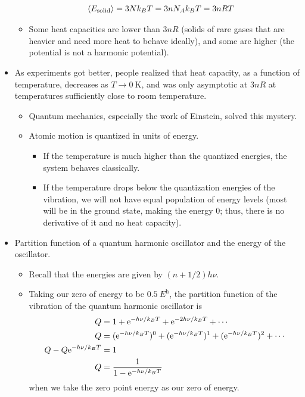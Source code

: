 \documentclass[../notes.tex]{subfiles}
\begin{document}
\begin{itemize}
\begin{itemize}
\begin{align*}
            \prb{E_\text{solid}} &= 3Nk_BT = 3nN_Ak_BT = 3nRT
        \end{align*}
        \item Some heat capacities are lower than $3nR$ (solids of rare gases that are heavier and need more heat to behave ideally), and some are higher (the potential is not a harmonic potential).
    \end{itemize}
    \item As experiments got better, people realized that heat capacity, as a function of temperature, decreases as $T\to\SI{0}{\kelvin}$, and was only asymptotic at $3nR$ at temperatures sufficiently close to room temperature.
    \begin{itemize}
        \item Quantum mechanics, especially the work of Einstein, solved this mystery.
        \item Atomic motion is quantized in units of energy.
        \begin{itemize}
            \item If the temperature is much higher than the quantized energies, the system behaves classically.
            \item If the temperature drops below the quantization energies of the vibration, we will not have equal population of energy levels (most will be in the ground state, making the energy 0; thus, there is no derivative of it and no heat capacity).
        \end{itemize}
    \end{itemize}
    \item Partition function of a quantum harmonic oscillator and the energy of the oscillator.
    \begin{itemize}
        \item Recall that the energies are given by $(n+1/2)h\nu$.
        \item Taking our zero of energy to be $\SI{0.5}{\hartree}$, the partition function of the vibration of the quantum harmonic oscillator is
        \begin{align*}
            Q &= 1+\e[-h\nu/k_BT]+\e[-2h\nu/k_BT]+\cdots\\
            Q &= (\e[-h\nu/k_BT])^0+(\e[-h\nu/k_BT])^1+(\e[-h\nu/k_BT])^2+\cdots\\
            Q-Q\e[-h\nu/k_BT] &= 1\\
            Q &= \frac{1}{1-\e[-h\nu/k_BT]}
        \end{align*}
        when we take the zero point energy as our zero of energy.

\end{itemize}
\end{itemize}
\end{document}
